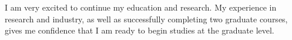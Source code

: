 I am very excited to continue my education and research. My experience in research and industry, as well as successfully completing two graduate courses, gives me confidence that I am ready to begin studies at the graduate level.  

